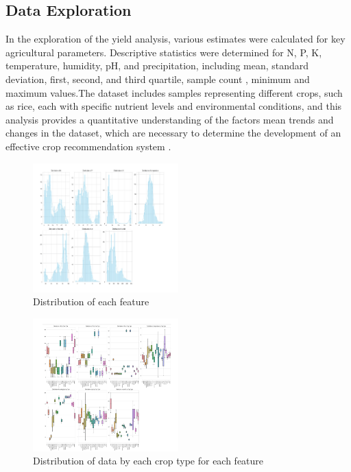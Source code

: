 



















\subsection{Data Exploration}

In the exploration of the yield analysis, various estimates were calculated for key agricultural parameters. Descriptive statistics were determined for N, P, K, temperature, humidity, pH, and precipitation, including mean, standard deviation, first, second, and third quartile, sample count , minimum and maximum values.The dataset includes samples representing different crops, such as rice, each with specific nutrient levels and environmental conditions, and this analysis provides a quantitative understanding of the factors mean trends and changes in the dataset, which are necessary to determine the development of an effective crop recommendation system . 


\begin{figure}[h]
    \centering
    \includegraphics[width=0.5\textwidth]{visual 1.png}
    \caption{Distribution of each feature}
    \label{fig:my_label}
    
\end{figure}


\begin{figure}[h]
    \centering
    \includegraphics[width=0.5\textwidth]{visual 2.png}
    \caption{Distribution of data by each crop type for each feature}
    \label{fig:my_label}
    
\end{figure}

